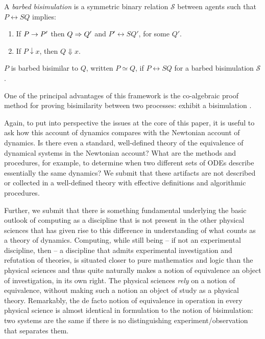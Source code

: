 \begin{definition}
A \emph{barbed bisimulation} is a symmetric binary relation 
${\mathcal S}$ between agents such that $P\rel{S}Q$ implies:
\begin{enumerate}
\item If $P \rightarrow P'$ then $Q \Rightarrow Q'$ and $P'\rel{S} Q'$, for some $Q'$.
\item If $P\downarrow x$, then $Q\Downarrow x$.
\end{enumerate}
$P$ is barbed bisimilar to $Q$, written
$P \simeq Q$, if $P \rel{S} Q$ for a barbed bisimulation ${\mathcal S}$.
\end{definition}

One of the principal advantages of this framework is the co-algebraic
proof method for proving bisimilarity between two processes: exhibit a
bisimulation \cite{DBLP:conf/lics/Sangiorgi04}.

Again, to put into perspective the issues at the core of this paper,
it is useful to ask how this account of dynamics compares with the
Newtonian account of dynamics. Is there even a standard, well-defined
theory of the equivalence of dynamical systems in the Newtonian
account? What are the methods and procedures, for example, to
determine when two different sets of ODEs describe essentially the
same dynamics? We submit that these artifacts are not described or
collected in a well-defined theory with effective definitions and
algorithmic procedures.

Further, we submit that there is something fundamental underlying the
basic outlook of computing as a discipline that is not present in the
other physical sciences that has given rise to this difference in
understanding of what counts as a theory of dynamics. Computing, while
still being -- if not an experimental discipline, then -- a discipline
that admits experimental investigation and refutation of theories, is
situated closer to pure mathematics and logic than the physical
sciences and thus quite naturally makes a notion of equivalence an
object of investigation, in its own right. The physical sciences
\emph{rely} on a notion of equivalence, without making such a notion
an object of study as a physical theory. Remarkably, the de facto
notion of equivalence in operation in every physical science is almost
identical in formulation to the notion of bisimulation: two systems
are the same if there is no distinguishing experiment/observation that
separates them.

